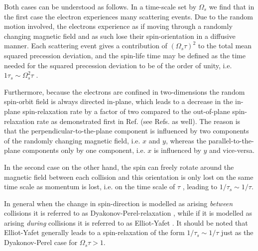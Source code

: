 Both cases can be understood as follows. In a time-scale set by $\Omega_s$ we find that in the first case the electron experiences many scattering events. Due to the random motion involved, the electrons experience as if moving through a randomly changing magnetic field and as such lose their spin-orientation in a diffusive manner. Each scattering event gives a contribution of $(\Omega_s\tau)^2$ to the total mean squared precession deviation, and the spin-life time may be defined as the time needed for the squared precession deviation to be of the order of unity, i.e. $1\tau_s\sim \Omega_s^2\tau$ \cite{dyakonov_spintronics_2004, dyakonov_spin_2017}. 

Furthermore, because the electrons are confined in two-dimensions the random spin-orbit field is always directed in-plane, which leads to a decrease in the in-plane spin-relaxation rate by a factor of two compared to the out-of-plane spin-relaxation rate as demonstrated first in Ref. \cite{DYAKONOV1986} (see Refs. \cite{aronov_spin_1983, averkiev_spin_2002, burkov_theory_2004, dyakonov_spin_2017} as well).  The reason is that the perpendicular-to-the-plane component is influenced by two components of the randomly changing magnetic field, i.e. $x$ and $y$, whereas the parallel-to-the-plane components only by one component, i.e. $x$ is influenced by $y$ and vice-versa.  

In the second case on the other hand, the spin can freely rotate around the magnetic field between each collision and this orientation is only lost on the same time scale as momentum is lost, i.e. on the time scale of $\tau$ \cite{aronov_spin_1983, dyakonov_spintronics_2004}, leading to $1/\tau_s \sim 1/\tau$.

In general when the change in spin-direction is modelled as arising \emph{between} collisions it is referred to as Dyakonov-Perel-relaxation \cite{dyakonov1972spin,DYAKONOV1986}, while if it is modelled as arising \emph{during} collisions it is referred to as Elliot-Yafet \cite{elliott_theory_1954,yafet_g_1963}. It should be noted that Elliot-Yafet generally leads to a spin-relaxation of the form $1/\tau_s\sim1/\tau$ just as the Dyakonov-Perel case for $\Omega_s\tau>1$. 
